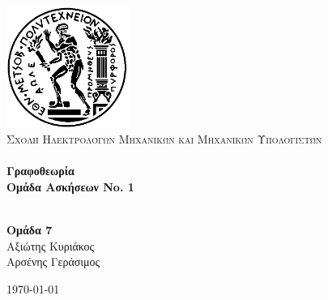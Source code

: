 \begin{titlepage}
\begin{center}

\includegraphics[width=0.3\textwidth]{./pyrforos.png}\\[1cm]

\textsc{\LARGE Σχολή Ηλεκτρολόγων Μηχανικών και Μηχανικών Υπολογιστών}\\[1.5cm]

\HRule \\[0.4cm]
{\huge \bfseries Γραφοθεωρία\\
\LARGE Ομάδα Ασκήσεων No. 1}\\[0.4cm]

\HRule \\[1.5cm]

\begin{center}
\textbf{Ομάδα 7}\\
Αξιώτης Κυριάκος\\
Αρσένης Γεράσιμος
\end{center}

\vfill

{\large \today}
\end{center}

\end{titlepage}
